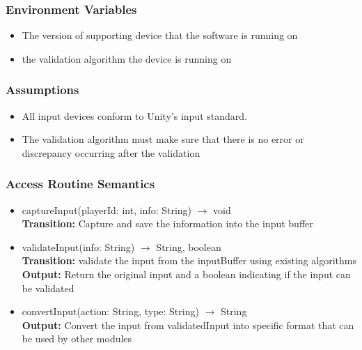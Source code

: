 \documentclass[12pt, titlepage]{article}
\begin{document}
\subsubsection{Environment Variables}
\begin{itemize}
\item The version of supporting device that the software is running on
\item the validation algorithm the device is running on
\end{itemize}

\subsubsection{Assumptions}
\begin{itemize}
\item All input devices conform to Unity's input standard.
\item The validation algorithm must make sure that there is no error or discrepancy occurring after the validation
\end{itemize}

\subsubsection{Access Routine Semantics}

\begin{itemize}
\item captureInput(playerId: int, info: String) $\rightarrow$ void\\
\textbf{Transition:} Capture and save the information into the input buffer

\item validateInput(info: String) $\rightarrow$ String, boolean\\
\textbf{Transition:} validate the input from the inputBuffer using existing algorithms\\
\textbf{Output:} Return the original input and a boolean indicating if the input can be validated

\item convertInput(action: String, type: String) $\rightarrow$ String\\
\textbf{Output:} Convert the input from validatedInput into specific format that can be used by other modules

\end{itemize}
\end{document}
